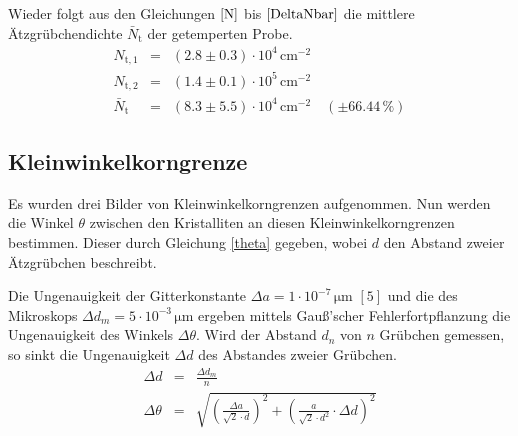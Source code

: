 \documentclass[12pt,a4paper]{scrartcl}
\numberwithin{equation}{section} %
\begin{document}
Wieder folgt aus den Gleichungen $\eqref{N}$ bis $\eqref{DeltaNbar}$
die mittlere Ätzgrübchendichte $\bar N_\mathrm{t}$ der getemperten
Probe.
\begin{eqnarray}
    N_\mathrm{t,1} &=& (2.8 \pm 0.3) \cdot 10^4 \mathrm{\, cm^{-2}} \\
    N_\mathrm{t,2} &=& (1.4 \pm 0.1) \cdot 10^5 \mathrm{\, cm^{-2}}
    \\
    \bar N_\mathrm{t}
        &=& (8.3 \pm 5.5) \cdot 10^4 \mathrm{\, cm^{-2}}
        \quad(\pm 66.44\,\%)
\end{eqnarray}

\hypertarget{kleinwinkelkorngrenze}{%
\subsection{Kleinwinkelkorngrenze}\label{kleinwinkelkorngrenze}}

Es wurden drei Bilder von Kleinwinkelkorngrenzen aufgenommen. Nun werden die Winkel $\theta$ zwischen den Kristalliten an diesen
Kleinwinkelkorngrenzen bestimmen. Dieser durch Gleichung
\eqref{theta} gegeben, wobei $d$ den Abstand zweier Ätzgrübchen
beschreibt.

Die Ungenauigkeit der Gitterkonstante $\Delta a=1 \cdot 10^{-7} \mathrm{\, \mu m}$ $[5]$ und die des Mikroskops $\Delta d_m = 5 \cdot 10^{-3} \mathrm{\, \mu m}$ ergeben
mittels Gauß'scher Fehlerfortpflanzung die Ungenauigkeit des Winkels
$\Delta \theta$. Wird der Abstand $d_n$ von $n$ Grübchen gemessen,
so sinkt die Ungenauigkeit $\Delta d$ des Abstandes zweier Grübchen.
\begin{eqnarray}
    \Delta d &=& \frac{\Delta d_m}{n} \\
    \Delta \theta &=& \sqrt{
        \left(\frac{\Delta a}{\sqrt{2} \cdot d} \right)^2
            + \left( \frac{a}{\sqrt{2} \cdot d^2} \cdot \Delta d \right)^2 }
            \label{DeltaTheta}
\end{eqnarray}
\end{document}
